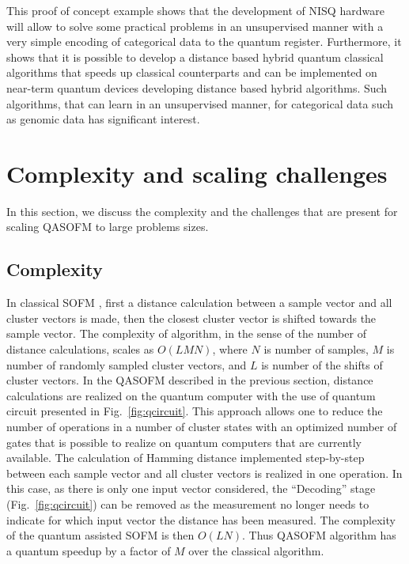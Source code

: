 \documentclass[%
  pra, aps, physrev,
  showkeys,
  twocolumn,
  showpacs,
  superscriptaddress,
  amsmath,amssymb,
  10pt
]{revtex4-2}
\begin{document}
This proof of concept example shows that the development of NISQ hardware will allow to solve some practical problems in an unsupervised manner with a very simple encoding of categorical data to the quantum register.
Furthermore, it shows that it is possible to develop a distance based hybrid quantum classical algorithms
that speeds up classical counterparts and can be implemented on near-term quantum devices
developing distance based hybrid algorithms. Such algorithms,
that can learn in an unsupervised manner, for categorical data such as genomic data has significant interest.



























\section{Complexity and scaling challenges}

In this section, we discuss the complexity and the challenges that are present for scaling QASOFM to large problems sizes.

\subsection{Complexity}

In classical SOFM \cite{kohonen1990}, first a distance calculation between a sample vector and all cluster vectors is made,
then the closest cluster vector is shifted towards the sample vector.
The complexity of algorithm, in the sense of the number of distance calculations, scales as $O(LMN)$,
where $N$ is number of samples,
$M$ is number of randomly sampled cluster vectors,
and $L$ is number of the shifts of cluster vectors.
In the QASOFM described in the previous section, distance calculations are realized on the quantum computer with the use of quantum circuit presented in Fig.~\ref{fig:qcircuit}. This approach allows one to reduce the number of operations in a number of cluster states with an optimized number of gates
that is possible to realize on quantum computers that are currently available.
The calculation of Hamming distance implemented step-by-step between each sample vector and all cluster vectors is realized in one operation. In this case, as there is only one input vector considered, the ``Decoding'' stage (Fig.~\ref{fig:qcircuit}) can be removed as the measurement no longer needs to indicate for which input vector the distance has been measured.
The complexity of the quantum assisted SOFM is then $O(LN)$.  Thus QASOFM algorithm has a quantum speedup by a factor of $ M $ over the classical algorithm.
\end{document}
